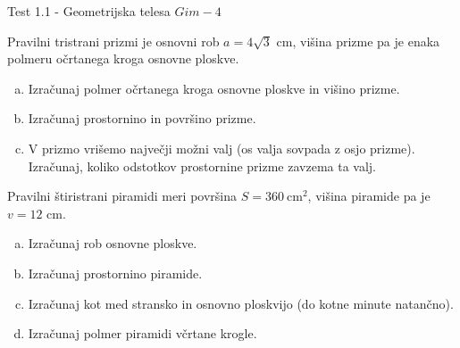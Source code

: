 \documentclass[a4paper,12pt]{letter}
\renewcommand{\headrulewidth}{3pt}
\renewcommand{\headrulewidth}{0.3pt}
\newcounter{tocke}
\begin{document}
\pagestyle{fancy}
\renewcommand\headrulewidth{0pt}
\lhead{}\chead{}\rhead{}
\rfoot{\vspace*{-2\baselineskip}}
\renewcommand{\vec}{\overrightarrow}
\def\programletnik{Gim - 4}
\def\naslov{Test 1.1 - }
\def\sklop{Geometrijska telesa}
\def\tockeA{4+4+4}
\def\tockeB{3+3+3+4}
\def\tockeC{4+3}
\def\tockeD{4+4}
\begin{minipage}{20cm}
\begin{bclogo}[couleur=brown!30,
  arrondi=0,ombre=true, couleurOmbre=gray!50,
logo =\bcplume,
  noborder=true]
{\textrm{{\Large{\naslov \sklop} \Huge{}
\large{} \hfill $\programletnik$}}}
\end{bclogo}
\end{minipage}
\begin{minipage}{20cm}
\begin{bclogo}[couleur=brown!30,
  arrondi=0,ombre=true, couleurOmbre=gray!50,
logo =\bcplume,
  noborder=true]
{\textrm{{}}}
\end{bclogo}
\end{minipage}

\begin{naloga}[\hfill $\tockeA$] \addtocounter{tocke}{\numexpr\tockeA\relax}
Pravilni tristrani prizmi je osnovni rob $a=4\sqrt3$ cm, vi\v{s}ina prizme pa je enaka polmeru o\v{c}rtanega kroga osnovne ploskve.
\begin{enumerate}[a)]
\item Izra\v{c}unaj polmer o\v{c}rtanega kroga osnovne ploskve in vi\v{s}ino prizme.
\item Izra\v{c}unaj prostornino in povr\v{s}ino prizme.
\item V prizmo vri\v{s}emo najve\v{c}ji mo\v{z}ni valj (os valja sovpada z osjo prizme). Izra\v{c}unaj, koliko odstotkov prostornine prizme zavzema ta valj.
\end{enumerate}
\end{naloga}\newpage

\begin{naloga}[\hfill $\tockeB$] \addtocounter{tocke}{\numexpr\tockeB\relax}
Pravilni \v{s}tiristrani piramidi meri povr\v{s}ina $S=360\ \text{cm}^2$, vi\v{s}ina piramide pa je $v=12$ cm.
\begin{enumerate}[a)]
\item Izra\v{c}unaj rob osnovne ploskve.
\item Izra\v{c}unaj prostornino piramide.
\item Izra\v{c}unaj kot med stransko in osnovno ploskvijo (do kotne minute natan\v{c}no).
\item Izra\v{c}unaj polmer piramidi včrtane krogle.
\end{enumerate}
\end{naloga}\newpage
\end{document}

